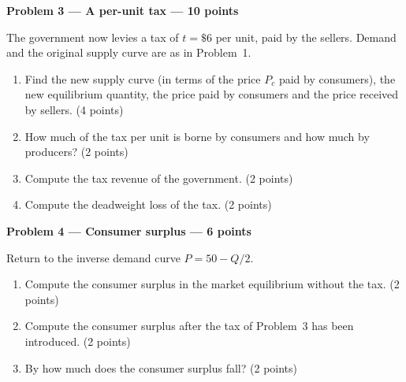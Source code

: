 \documentclass[11pt,a4paper]{article}
\newcommand{\problem}[3]{\bigskip\par\noindent\textbf{Problem #1 --- #2 --- #3 points}\par\nopagebreak\smallskip}
\begin{document}
\problem{3}{A per-unit tax}{10}
The government now levies a tax of $t = \$6$ per unit, paid by the sellers. Demand and the original
supply curve are as in Problem~1.
\begin{enumerate}
  \item Find the new supply curve (in terms of the price $P_c$ paid by consumers), the new equilibrium
        quantity, the price paid by consumers and the price received by sellers. (4 points)
  \item How much of the tax per unit is borne by consumers and how much by producers? (2 points)
  \item Compute the tax revenue of the government. (2 points)
  \item Compute the deadweight loss of the tax. (2 points)
\end{enumerate}

\problem{4}{Consumer surplus}{6}
Return to the inverse demand curve $P = 50 - Q/2$.
\begin{enumerate}
  \item Compute the consumer surplus in the market equilibrium without the tax. (2 points)
  \item Compute the consumer surplus after the tax of Problem~3 has been introduced. (2 points)
  \item By how much does the consumer surplus fall? (2 points)
\end{enumerate}
\end{document}
